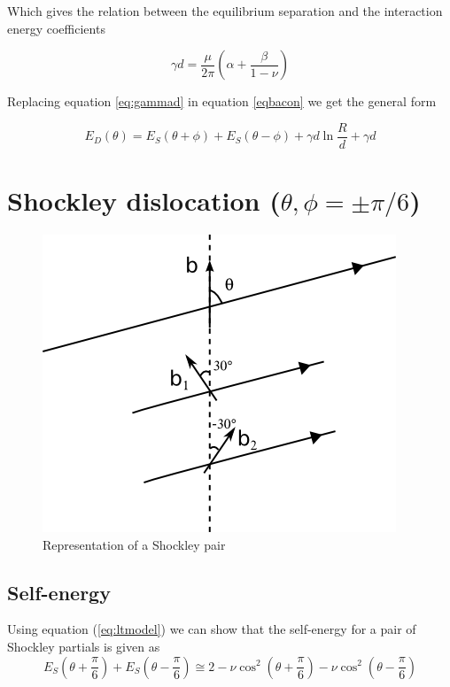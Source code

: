 \documentclass[10pt,a4paper,final]{article}
\begin{document}
Which gives the relation between the equilibrium separation and the interaction energy coefficients

\begin{equation}
\gamma d = \frac{\mu}{2\pi}\left(\alpha+\frac{\beta}{1-\nu}\right) \label{eq:gammad}
\end{equation}

Replacing equation \ref{eq:gammad} in equation \ref{eqbacon} we get the general form

\begin{equation}
\boxed{
E_D(\theta) = E_S(\theta+\phi) + E_S(\theta-\phi) + \gamma d \ln\frac{R}{d} + \gamma d} \label{eq:finalED}
\end{equation}

\section{Shockley dislocation ($\theta, \phi=\pm\pi/6$)}
\begin{figure}[hbtp]
\centering
\includegraphics[scale=1]{png/shockley_schema.png}
\caption{Representation of a Shockley pair}
\end{figure}

\subsection{Self-energy}
Using equation (\ref{eq:ltmodel}) we can show that the self-energy for a pair of Shockley partials is given as
\begin{equation}
E_S\left(\theta+\frac{\pi}{6}\right) + E_S\left(\theta-\frac{\pi}{6}\right) \cong 2 - \nu\cos^2\left(\theta+\frac{\pi}{6}\right) - \nu\cos^2\left(\theta-\frac{\pi}{6}\right) \label{eq:self1shoc}
\end{equation}
\end{document}
